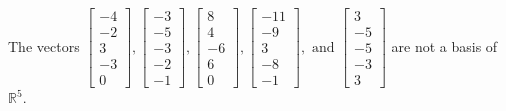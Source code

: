 \begin{exercise}
\begin{exerciseStatement}
  \end{exerciseStatement}
  \begin{exerciseAnswer}
   The vectors \(\left[\begin{array}{r}
-4 \\
-2 \\
3 \\
-3 \\
0
\end{array}\right] , \left[\begin{array}{r}
-3 \\
-5 \\
-3 \\
-2 \\
-1
\end{array}\right] , \left[\begin{array}{r}
8 \\
4 \\
-6 \\
6 \\
0
\end{array}\right] , \left[\begin{array}{r}
-11 \\
-9 \\
3 \\
-8 \\
-1
\end{array}\right] , \text{ and } \left[\begin{array}{r}
3 \\
-5 \\
-5 \\
-3 \\
3
\end{array}\right]\) 
  	 are not  a basis of \(\mathbb{R}^5\).
  


  \end{exerciseAnswer}
\end{exercise}